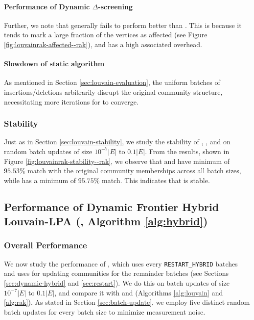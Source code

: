 \paragraph{Performance of Dynamic $\Delta$-screening}

Further, we note that \DelLPA{} generally fails to perform better than \NaiLPA{}. This is because it tends to mark a large fraction of the vertices as affected (see Figure \ref{fig:louvainrak-affected--rak}), and has a high associated overhead.

\paragraph{Slowdown of static algorithm}

As mentioned in Section \ref{sec:louvain-evaluation}, the uniform batches of insertions/deletions arbitrarily disrupt the original community structure, necessitating more iterations for \StaLPA{} to converge.


\subsubsection{Stability}
\label{sec:rak-stability}

Just as in Section \ref{sec:louvain-stability}, we study the stability of \NaiLPA{}, \DelLPA{}, and \FroLPA{} on random batch updates of size $10^{-7} |E|$ to $0.1 |E|$. From the results, shown in Figure \ref{fig:louvainrak-stability--rak}, we observe that \NaiLPA{} and \DelLPA{} have minimum of $95.53\%$ match with the original community memberships across all batch sizes, while \FroLPA{} has a minimum of $95.75\%$ match. This indicates that \FroLPA{} is stable.




\subsection{Performance of Dynamic Frontier Hybrid Louvain-LPA (\FroHyb{}, Algorithm \ref{alg:hybrid})}
\label{sec:hybrid-evaluation}

\subsubsection{Overall Performance}

We now study the performance of \FroHyb{}, which uses \StaLou{} every \verb|RESTART_HYBRID| batches and uses \FroLPA{} for updating communities for the remainder batches (see Sections \ref{sec:dynamic-hybrid} and \ref{sec:restart}). We do this on batch updates of size $10^{-7} |E|$ to $0.1 |E|$, and compare it with \FroLou{} and \FroLPA{} (Algorithms \ref{alg:louvain} and \ref{alg:rak}). As stated in Section \ref{sec:batch-update}, we employ five distinct random batch updates for every batch size to minimize measurement noise.

